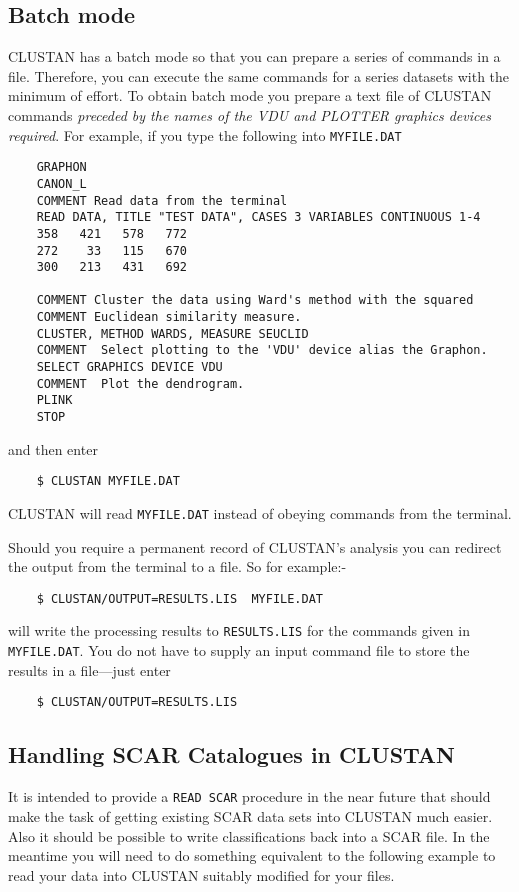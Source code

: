 \subsection{Batch mode}
{\small CLUSTAN} has a batch mode so that you can prepare a series of commands
in a file.  Therefore, you can execute the same commands for a series
datasets with the minimum of effort.  To obtain batch mode you prepare
a text file of {\small CLUSTAN} commands {\em preceded by the names of the
VDU and PLOTTER graphics devices required}.  For example, if you type the
following into {\tt MYFILE.DAT}
\begin{verbatim}
    GRAPHON
    CANON_L
    COMMENT Read data from the terminal
    READ DATA, TITLE "TEST DATA", CASES 3 VARIABLES CONTINUOUS 1-4
    358   421   578   772
    272    33   115   670
    300   213   431   692

    COMMENT Cluster the data using Ward's method with the squared
    COMMENT Euclidean similarity measure.
    CLUSTER, METHOD WARDS, MEASURE SEUCLID
    COMMENT  Select plotting to the 'VDU' device alias the Graphon.
    SELECT GRAPHICS DEVICE VDU
    COMMENT  Plot the dendrogram.
    PLINK
    STOP
\end{verbatim}
and then enter
\begin{verbatim}
    $ CLUSTAN MYFILE.DAT
\end{verbatim}
{\small CLUSTAN} will read {\tt MYFILE.DAT} instead of obeying commands from the
terminal.

Should you require a permanent record of {\small CLUSTAN}'s analysis you can
redirect the output from the terminal to a file.  So for example:-
\begin{verbatim}
    $ CLUSTAN/OUTPUT=RESULTS.LIS  MYFILE.DAT
\end{verbatim}
will write the processing results to {\tt RESULTS.LIS} for the commands
given in {\tt MYFILE.DAT}.  You do not have to supply an input command
file to store the results in a file---just enter
\begin{verbatim}
    $ CLUSTAN/OUTPUT=RESULTS.LIS
\end{verbatim}
\subsection{Handling SCAR Catalogues in CLUSTAN}
It is intended to provide a {\tt READ SCAR} procedure in the near future
that should make the task of getting existing SCAR data sets into
{\small CLUSTAN} much easier.  Also it should be possible to write
classifications back into a SCAR file. In the meantime you will need to
do something equivalent to the following example to read your data into
{\small CLUSTAN} suitably modified for your files.

